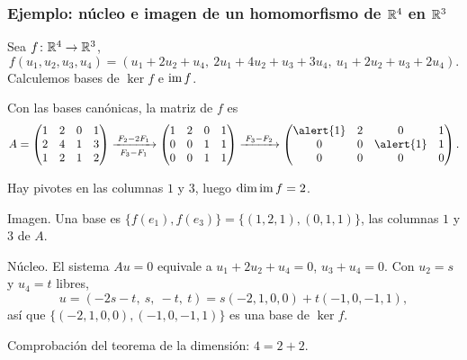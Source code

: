 \begin{frame}[allowframebreaks, t]
    \frametitle{Ejemplo: núcleo e imagen de un homomorfismo de $\mathbb{R}^4$ en $\mathbb{R}^3$}

    \begin{example}
        Sea $f\colon\mathbb{R}^4\to\mathbb{R}^3$,
        \[
            f(u_1,u_2,u_3,u_4)=(u_1+2u_2+u_4,\ 2u_1+4u_2+u_3+3u_4,\ u_1+2u_2+u_3+2u_4).
        \]
        Calculemos bases de $\ker f$ e $\operatorname{im} f$.
    \end{example}

    Con las bases canónicas, la matriz de $f$ es
    \[
        A=\begin{pmatrix}
            1&2&0&1\\2&4&1&3\\1&2&1&2
        \end{pmatrix}
        \xrightarrow[\;F_3-F_1\;]{\;F_2-2F_1\;}
        \begin{pmatrix}
            1&2&0&1\\0&0&1&1\\0&0&1&1
        \end{pmatrix}
        \xrightarrow{\;F_3-F_2\;}
        \begin{pmatrix}
            \alert{1}&2&0&1\\0&0&\alert{1}&1\\0&0&0&0
        \end{pmatrix}.
    \]

    \framebreak

    Hay pivotes en las columnas $1$ y $3$, luego $\dim\operatorname{im} f=2$.

    \medskip

    \alert{Imagen.} Una base es $\{f(e_1),f(e_3)\}=\{(1,2,1),(0,1,1)\}$,
    las columnas $1$ y $3$ de $A$.

    \medskip

    \alert{Núcleo.} El sistema $Au=0$ equivale a $u_1+2u_2+u_4=0$,
    $u_3+u_4=0$. Con $u_2=s$ y $u_4=t$ libres,
    \[
        u=(-2s-t,\ s,\ -t,\ t)=s(-2,1,0,0)+t(-1,0,-1,1),
    \]
    así que $\{(-2,1,0,0),(-1,0,-1,1)\}$ es una base de $\ker f$.

    \medskip

    Comprobación del teorema de la dimensión: $4=2+2$.
\end{frame}


